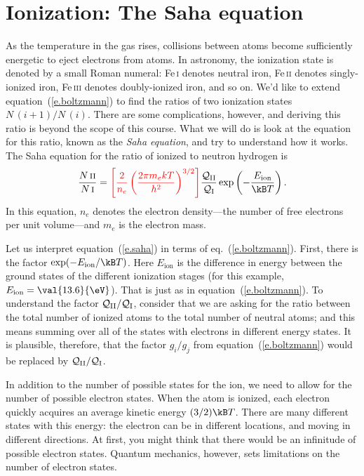 \section{Ionization: The Saha equation}
\label{s.saha-eqn}

As the temperature in the gas rises, collisions between atoms become sufficiently energetic to eject electrons from atoms.  In astronomy, the ionization state is denoted by a small Roman numeral: Fe\,\textsc{i} denotes neutral iron, Fe\,\textsc{ii} denotes singly-ionized iron, Fe\,\textsc{iii} denotes doubly-ionized iron, and so on. We'd like to extend equation~(\ref{e.boltzmann}) to find the ratios of two ionization states $N\,(i+1)/N\,(i)$.  There are some complications, however, and deriving this ratio is beyond the scope of this course. What we will do is look at the equation for this ratio, known as the \emph{Saha equation}, and try to understand how it works.  The Saha equation for the ratio of ionized to neutron hydrogen is
\begin{equation}\label{e.saha}
\frac{N\,\textrm{\scshape ii}}{N\,\textrm{\scshape i}} 
= {\color{red}\left[\frac{2}{n_{e}}
\left(\frac{2\pi m_{e}kT}{h^{2}}\right)^{3/2}\right]}
\frac{\pfcn_{\mathrm{II}}}{\pfcn_{\mathrm{I}}} \exp\left(-\frac{E_{\mathrm{ion}}}{\kB T}\right).
\end{equation}
In this equation, $n_{e}$ denotes the electron density---the number of free electrons per unit volume---and $m_{e}$ is the electron mass.

Let us interpret equation~(\ref{e.saha}) in terms of eq.~(\ref{e.boltzmann}).  First, there is the factor $\exp(-E_{\mathrm{ion}}/\kB T)$. Here $E_{\mathrm{ion}}$ is the difference in energy between the ground states of the different ionization stages (for this example, $E_{\mathrm{ion}} = \val{13.6}{\eV}$).  That is just as in equation~(\ref{e.boltzmann}). To understand the factor $\mathcal{Q}_{\mathrm{II}}/\mathcal{Q}_{\mathrm{I}}$, consider that we are asking for the ratio between the total number of ionized atoms to the total number of neutral atoms; and this means summing over all of the states with electrons in different energy states. It is plausible, therefore, that the factor $g_{i}/g_{j}$ from equation~(\ref{e.boltzmann}) would be replaced by $\mathcal{Q}_{\mathrm{II}}/\mathcal{Q}_{\mathrm{I}}$.

In addition to the number of possible states for the ion, we need to allow for the number of possible electron states.  When the atom is ionized, each electron quickly acquires an average kinetic energy $(3/2)\kB T$. There are many different states with this energy: the electron can be in different locations, and moving in different directions.  At first, you might think that there would be an infinitude of possible electron states.  Quantum mechanics, however, sets limitations on the number of electron states.

